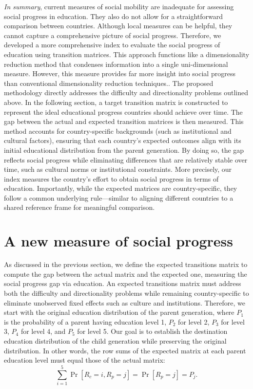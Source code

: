 \textit{In summary}, current measures of social mobility are inadequate for assessing social progress in education. They also do not allow for a straightforward comparison between countries. Although local measures can be helpful, they cannot capture a comprehensive picture of social progress. Therefore, we developed a more comprehensive index to evaluate the social progress of education using transition matrices. This approach functions like a dimensionality reduction method that condenses information into a single uni-dimensional measure. However, this measure provides far more insight into social progress than conventional dimensionality reduction techniques.. The proposed methodology directly addresses the difficulty and directionality problems outlined above. In the following section, a target transition matrix is constructed to represent the ideal educational progress countries should achieve over time. The gap between the actual and expected transition matrices is then measured. This method accounts for country-specific backgrounds (such as institutional and cultural factors), ensuring that each country’s expected outcomes align with its initial educational distribution from the parent generation. By doing so, the gap reflects social progress while eliminating differences that are relatively stable over time, such as cultural norms or institutional constraints. More precisely, our index measures the country's effort to obtain social progress in terms of education. Importantly, while the expected matrices are country-specific, they follow a common underlying rule—similar to aligning different countries to a shared reference frame for meaningful comparison.

\section{A new measure of social progress} \label{sec:new}

As discussed in the previous section, we define the expected transitions matrix to compute the gap between the actual matrix and the expected one, measuring the social progress gap via education. An expected transitions matrix must address both the difficulty and directionality problems while remaining country-specific to eliminate unobserved fixed effects such as culture and institutions. Therefore, we start with the original education distribution of the parent generation, where \( P_1 \) is the probability of a parent having education level 1, \( P_2 \) for level 2, \( P_3 \) for level 3, \( P_4 \) for level 4, and \( P_5 \) for level 5. Our goal is to establish the destination education distribution of the child generation while preserving the original distribution. In other words, the row sums of the expected matrix at each parent education level must equal those of the actual matrix:  
\begin{equation}
\sum_{i=1}^{5} \operatorname{Pr}[R_c = i, R_p = j] = \operatorname{Pr}[R_p = j] = P_j.
\label{eq:1}
\end{equation}

